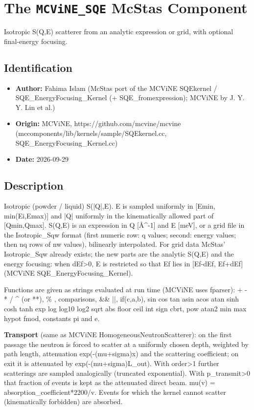 \section{The \texttt{MCViNE\_SQE} McStas Component}
Isotropic S(Q,E) scatterer from an analytic expression or grid, with optional final-energy focusing.

\subsection*{Identification}
\begin{itemize}
  \item \textbf{Author:} Fahima Islam (McStas port of the MCViNE SQEkernel / SQE\_EnergyFocusing\_Kernel (+ SQE\_fromexpression); MCViNE by J. Y. Y. Lin et al.)
  \item \textbf{Origin:} MCViNE, https://github.com/mcvine/mcvine (mccomponents/lib/kernels/sample/SQEkernel.cc, SQE\_EnergyFocusing\_Kernel.cc)
  \item \textbf{Date:} 2026-09-29
\end{itemize}

\subsection*{Description}
Isotropic (powder / liquid) S(|Q|,E). E is sampled uniformly in [Emin, min(Ei,Emax)] and |Q| uniformly in the kinematically allowed part of [Qmin,Qmax]. S(Q,E) is an expression in Q [\AA{}\textasciicircum{}-1] and E [meV], or a grid file in the Isotropic\_Sqw format (first numeric row: q values; second: energy values; then nq rows of nw values), bilinearly interpolated. For grid data McStas' Isotropic\_Sqw already exists; the new parts are the analytic S(Q,E) and the energy focusing: when dEf\textgreater{}0, E is restricted so that Ef lies in [Ef-dEf, Ef+dEf] (MCViNE SQE\_EnergyFocusing\_Kernel).

Functions are given as strings evaluated at run time (MCViNE uses fparser): + - * / \textasciicircum{} (or **), \% , comparisons, \&\& ||, if(c,a,b), sin cos tan asin acos atan sinh cosh tanh exp log log10 log2 sqrt abs floor ceil int sign cbrt, pow atan2 min max hypot fmod, constants pi and e.

\textbf{Transport} (same as MCViNE HomogeneousNeutronScatterer): on the first passage the neutron is forced to scatter at a uniformly chosen depth, weighted by path length, attenuation exp(-(mu+sigma)x) and the scattering coefficient; on exit it is attenuated by exp(-(mu+sigma)L\_out). With order\textgreater{}1 further scatterings are sampled analogically (truncated exponential). With p\_transmit\textgreater{}0 that fraction of events is kept as the attenuated direct beam. mu(v) = absorption\_coefficient*2200/v. Events for which the kernel cannot scatter (kinematically forbidden) are absorbed.

